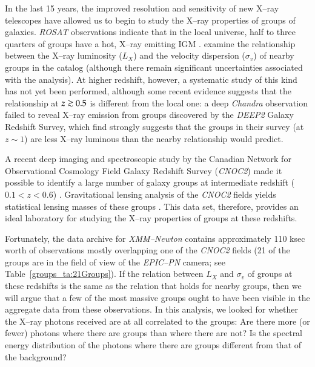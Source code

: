 In the last 15 years, the improved resolution and sensitivity of new
X--ray telescopes have allowed us to begin to study the X--ray
properties of groups of galaxies.  \textsl{ROSAT} observations
indicate that in the local universe, half to three quarters of groups
have a hot, X--ray emitting IGM \citep{mulchaey2000}.
\citet*[hereafter PT04]{plionis+tovmassian2004} examine the
relationship between the X--ray luminosity ($L_X$) and the velocity
dispersion ($\sigma_v$) of nearby groups in the \citet[hereafter
M03]{mulchaey_et_al2003} catalog (although there remain significant
uncertainties associated with the analysis).  At higher redshift,
however, a systematic study of this kind has not yet been performed,
although some recent evidence suggests that the relationship at $z
\gsim 0.5$ is different from the local one: a deep \textsl{Chandra}
observation failed to reveal X--ray emission from groups discovered by
the \textsl{DEEP2} Galaxy Redshift Survey, which
\citet{fang_et_al2007} find strongly suggests that the groups in their
survey (at $z \sim 1$) are less X--ray luminous than the nearby
relationship would predict.

A recent deep imaging and spectroscopic study by the Canadian Network
for Observational Cosmology Field Galaxy Redshift Survey
(\textsl{CNOC2}) made it possible to identify a large number of galaxy
groups at intermediate redshift ($0.1 < z < 0.6$)
\citep{carlberg2001eg, carlberg2001gg}.  Gravitational lensing
analysis of the \textsl{CNOC2} fields yields statistical lensing
masses of these groups \citep{hoekstra_et_al2001}.  This data set,
therefore, provides an ideal laboratory for studying the X--ray
properties of groups at these redshifts.

Fortunately, the data archive for \textsl{XMM--Newton} contains
approximately 110 ksec worth of observations mostly overlapping one of
the \textsl{CNOC2} fields (21 of the groups are in the field of view
of the \textsl{EPIC--PN} camera; see Table~\ref{groups_ta:21Groups}).
If the relation between $L_X$ and $\sigma_v$ of groups at these
redshifts is the same as the relation that holds for nearby groups,
then we will argue that a few of the most massive groups ought to have
been visible in the aggregate data from these observations.  In this
analysis, we looked for whether the X--ray photons received are at all
correlated to the groups:  Are there more (or fewer) photons
where there are groups than where there are not?   Is the
spectral energy distribution of the photons where there are groups
different from that of the background?

